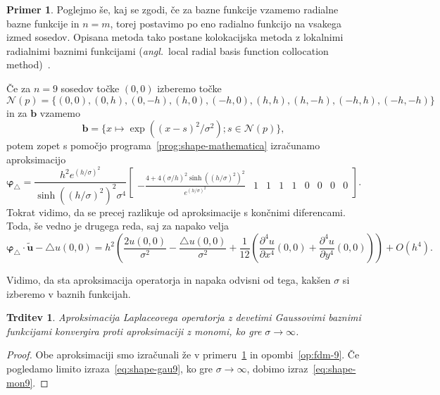 \documentclass[12pt,a4paper,twoside]{article}
\theoremstyle{definition} %
\newtheorem{primer}[definicija]{Primer}
\theoremstyle{plain} %
\newtheorem{trditev}[definicija]{Trditev}
\numberwithin{equation}{section}
\newcommand{\Nc}{\mathcal{N}}
\newcommand{\lap}{\triangle}
\renewcommand{\b}{\boldsymbol}
\renewcommand{\phi}{\varphi}
\newcommand{\dpar}[2]{\ensuremath{\frac{\partial #1}{\partial #2}}}
\newcommand{\ang}[1]{(\hspace{-1.5px}\textit{angl.}\ #1)}
\begin{document}
\begin{primer}
\label{prim:rbf}
Poglejmo še, kaj se zgodi, če za bazne funkcije vzamemo radialne bazne funkcije in $n = m$, torej
postavimo po eno radialno funkcijo na vsakega izmed sosedov. Opisana metoda tako postane
kolokacijska metoda z lokalnimi radialnimi baznimi funkcijami \ang{local radial basis function
collocation method}~\cite{kosec2011h}.

Če za $n = 9$ sosedov točke $(0, 0)$ izberemo točke
\small
\begin{equation}
  \Nc(p) = \{  (0, 0), (0, h), (0, -h), (h, 0), (-h, 0), (h, h), (h, -h), (-h, h), (-h, -h)\}
\end{equation}
\normalsize
in za $\b b$ vzamemo
\begin{equation}
  \b b = \{ x\mapsto \exp((x-s)^2/\sigma^2); s \in \Nc(p)\},
\end{equation}
potem zopet s pomočjo programa~\ref{prog:shape-mathematica} izračunamo aproksimacijo
\begin{equation}
  \b\phi_\lap =\textstyle \frac{h^2 e^{(h/\sigma)^2}}{\sinh((h/\sigma)^2)^2 \sigma^4}
\begin{bmatrix}
  -\frac{4 + 4(\sigma/h)^2  \sinh((h/\sigma)^2)^2 }{e^{(h/\sigma)^2}} & 1 & 1 & 1 & 1 & 0 & 0 & 0 & 0
 \end{bmatrix}.
  \label{eq:shape-gau9}
\end{equation}
Tokrat vidimo, da se precej razlikuje od aproksimacije s končnimi diferencami.
Toda, še vedno je drugega reda, saj za napako velja
\begin{equation}
  \b \phi_\lap\!\cdot \b{\tilde{u}} - \lap u(0, 0) = \textstyle
  h^2\left(\frac{2u(0, 0)}{\sigma^2} - \frac{\lap u(0, 0)}{\sigma^2} +
  \frac{1}{12}\left( \dpar{^4u}{x^4}(0, 0) + \dpar{^4u}{y^4}(0, 0) \right)\right)
  + O(h^4).
\end{equation}
\end{primer}

Vidimo, da sta aproksimacija operatorja in napaka odvisni od tega, kakšen
$\sigma$ si izberemo v baznih funkcijah.
\begin{trditev}
  \label{trd:rbf-konv-k-mon}
  Aproksimacija Laplaceovega operatorja z devetimi Gaussovimi baznimi funkcijami
  konvergira proti aproksimaciji z monomi, ko gre $\sigma \to \infty$.
\end{trditev}
\begin{proof}
  Obe aproksimaciji smo izračunali že v primeru~\ref{prim:rbf} in
  opombi~\ref{op:fdm-9}. Če pogledamo limito izraza~\eqref{eq:shape-gau9},
  ko gre $\sigma \to \infty$, dobimo izraz~\eqref{eq:shape-mon9}.
\end{proof}
\end{document}

